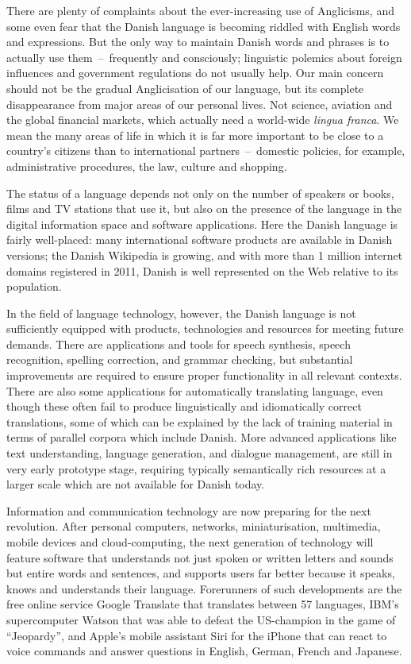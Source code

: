 \begin{multicols}{2}
There are plenty of complaints about the ever-increasing use of
Anglicisms, and some even fear that the Danish language is becoming
riddled with English words and expressions. But the only way to
maintain Danish words and phrases is to actually use
them~--~frequently and consciously; linguistic polemics about foreign
influences and government regulations do not usually help. Our main
concern should not be the gradual Anglicisation of our language, but
its complete disappearance from major areas of our personal lives. Not
science, aviation and the global financial markets, which actually
need a world-wide {\it lingua franca}. We mean the many areas of life in
which it is far more important to be close to a country's citizens
than to international partners~--~domestic policies, for example,
administrative procedures, the law, culture and shopping.

The status of a language depends not only on the number of speakers or
books, films and TV stations that use it, but also on the presence of
the language in the digital information space and software
applications. Here the Danish language is fairly well-placed: many
international software products are available in Danish versions; the
Danish Wikipedia is growing, and with more than 1 million internet
domains registered in 2011, Danish is well represented on the Web
relative to its population.

In the field of language technology, however, the Danish language is
not sufficiently equipped with products, technologies and resources
for meeting future demands. There are applications and tools for
speech synthesis, speech recognition, spelling correction, and grammar
checking, but substantial improvements are required to ensure proper
functionality in all relevant contexts. There are also some
applications for automatically translating language, even though these
often fail to produce linguistically and idiomatically correct
translations, some of which can be explained by the lack of training
material in terms of parallel corpora which include Danish.  More
advanced applications like text understanding, language generation,
and dialogue management, are still in very early prototype stage,
requiring typically semantically rich resources at a larger scale
which are not available for Danish today.


Information and communication technology are now preparing for the
next revolution. After personal computers, networks, miniaturisation,
multimedia, mobile devices and cloud-computing, the next generation of
technology will feature software that understands not just spoken or
written letters and sounds but entire words and sentences, and
supports users far better because it speaks, knows and understands
their language. Forerunners of such developments are the free online
service Google Translate that translates between 57 languages, IBM's
supercomputer Watson that was able to defeat the US-champion in the
game of ``Jeopardy'', and Apple's mobile assistant Siri for the
iPhone that can react to voice commands and answer questions in
English, German, French and Japanese.


\end{multicols}

